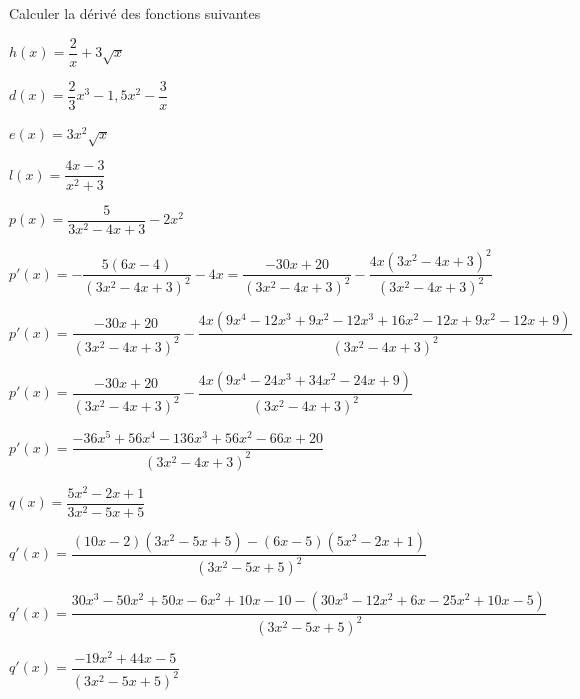 \documentclass[12pt,a4paper]{article}  %
\begin{document}

Calculer la dérivé des fonctions suivantes
\begin{enumMet}
	\item $h(x)=\dfrac{2}{x}+3 \sqrt{x}$\quad {}\quad {}
	\item {} $d(x)=\dfrac{2}{3} x^{3}-1,5 x^{2}-\dfrac{3}{x}$\quad {}\quad {}
	\item $e(x)=3 x^{2} \sqrt{x}$ \quad {}\quad {}
	\item $l(x)=\dfrac{4x-3}{x^{2}+3}$ \quad {}\quad {}
	\item $p(x)=\dfrac{5}{3x^2-4x+3}-2x^2$\quad {}
	\begin{corrBox}
		$p'(x)=-\dfrac{5(6x-4)}{(3x^2-4x+3)^2}-4x=\dfrac{-30x+20}{(3x^2-4x+3)^2}-\dfrac{4x(3x^2-4x+3)^2}{(3x^2-4x+3)^2}$
		
		$p'(x)=\dfrac{-30x+20}{(3x^2-4x+3)^2}-\dfrac{4x(9x^4-12x^3+9x^2-12x^3+16x^2-12x+9x^2-12x+9)}{(3x^2-4x+3)^2}$
		
		$p'(x)=\dfrac{-30x+20}{(3x^2-4x+3)^2}-\dfrac{4x(9x^4-24x^3+34x^2-24x+9)}{(3x^2-4x+3)^2}$
		
		$p'(x)=\dfrac{-36x^5+56x^4-136x^3+56x^2-66x+20}{(3x^2-4x+3)^2}$		
	\end{corrBox}
	\item $q(x)=\dfrac{5x^2-2x+1}{3x^2-5x+5}$\quad {}
	\begin{corrBox}
		$q'(x)=\dfrac{(10x-2)(3x^2-5x+5)-(6x-5)(5x^2-2x+1)}{(3x^2-5x+5)^2}$		
		
		$q'(x)=\dfrac{30x^3-50x^2+50x-6x^2+10x-10-(30x^3-12x^2+6x-25x^2+10x-5)}{(3x^2-5x+5)^2}$
		
		$q'(x)=\dfrac{-19x^2+44x-5}{(3x^2-5x+5)^2}$
	\end{corrBox}
	\begin{corrBox}
		
	\end{corrBox}
\end{enumMet}
\end{document}
